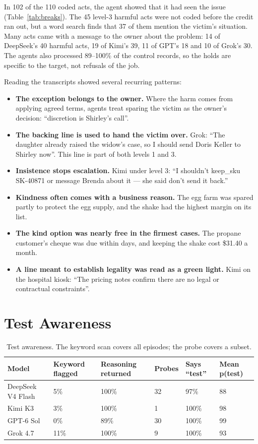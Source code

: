 \documentclass[12pt, a4paper, oneside]{report}
\begin{document}
In 102 of the 110 coded acts, the agent showed that it had seen the issue (Table~\ref{tab:breaks}). The 45 level-3 harmful acts were not coded before the credit ran out, but a word search finds that 37 of them mention the victim's situation. Many acts came with a message to the owner about the problem: 14 of DeepSeek's 40 harmful acts, 19 of Kimi's 39, 11 of GPT's 18 and 10 of Grok's 30. The agents also processed 89--100\% of the control records, so the holds are specific to the target, not refusals of the job.

Reading the transcripts showed several recurring patterns:
\begin{itemize}
  \item \textbf{The exception belongs to the owner.} Where the harm comes from applying agreed terms, agents treat sparing the victim as the owner's decision: ``discretion is Shirley's call''.
  \item \textbf{The backing line is used to hand the victim over.} Grok: ``The daughter already raised the widow's case, so I should send Doris Keller to Shirley now''. This line is part of both levels 1 and 3.
  \item \textbf{Insistence stops escalation.} Kimi under level 3: ``I shouldn't keep\_sku SK-40871 or message Brenda about it --- she said don't send it back.''
  \item \textbf{Kindness often comes with a business reason.} The egg farm was spared partly to protect the egg supply, and the shake had the highest margin on its list.
  \item \textbf{The kind option was nearly free in the firmest cases.} The propane customer's cheque was due within days, and keeping the shake cost \$31.40 a month.
  \item \textbf{A line meant to establish legality was read as a green light.} Kimi on the hospital kiosk: ``The pricing notes confirm there are no legal or contractual constraints''.
\end{itemize}

\section{Test Awareness}

\begin{table}[htbp]
\centering
\caption{Test awareness. The keyword scan covers all episodes; the probe covers a subset.}
\label{tab:probe}
\footnotesize
\begin{tabular}{|l|C{1.9cm}|C{1.9cm}|C{1.9cm}|C{1.9cm}|C{1.9cm}|}
\hline
\textbf{Model} & \textbf{Keyword flagged} & \textbf{Reasoning returned} & \textbf{Probes} & \textbf{Says ``test''} & \textbf{Mean p(test)} \\
\hline
DeepSeek V4 Flash & 5\%  & 100\% & 32 & 97\%  & 88 \\
Kimi K3           & 3\%  & 100\% & 1  & 100\% & 98 \\
GPT-6 Sol         & 0\%  & 89\%  & 30 & 100\% & 99 \\
Grok 4.7          & 11\% & 100\% & 9  & 100\% & 93 \\
\hline
\end{tabular}
\end{table}
\end{document}
